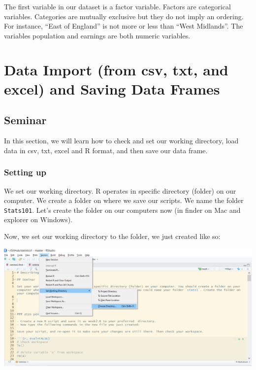 \documentclass[]{article}
\begin{document}
The first variable in our dataset is a factor variable. Factors are categorical variables. Categories are mutually exclusive but they do not imply an ordering. For instance, ``East of England'' is not more or less than ``West Midlands''. The variables population and earnings are both numeric variables.

\hypertarget{data-import-from-csv-txt-and-excel-and-saving-data-frames}{%
\section{Data Import (from csv, txt, and excel) and Saving Data Frames}\label{data-import-from-csv-txt-and-excel-and-saving-data-frames}}

\hypertarget{seminar-2}{%
\subsection{Seminar}\label{seminar-2}}

In this section, we will learn how to check and set our working directory, load data in csv, txt, excel and R format, and then save our data frame.

\hypertarget{setting-up}{%
\subsubsection{Setting up}\label{setting-up}}

We set our working directory. R operates in specific directory (folder) on our computer. We create a folder on where we save our scripts. We name the folder \texttt{Stats101}. Let's create the folder on our computers now (in finder on Mac and explorer on Windows).

Now, we set our working directory to the folder, we just created like so:

\includegraphics{./img/setwdir.png}
\end{document}
